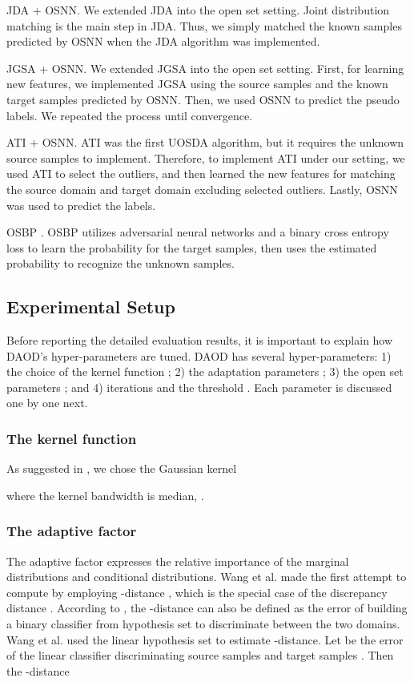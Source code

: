 \documentclass[journal]{IEEEtran}
\begin{document}
 JDA \cite{long2013transfer} + OSNN. We extended JDA into the open set setting. Joint distribution matching is the main step in JDA. Thus, we simply matched the known samples predicted by OSNN when the JDA algorithm was implemented.

 JGSA \cite{DBLP:conf/cvpr/ZhangLO17} + OSNN. We extended JGSA into the open set setting. First, for learning new features, we implemented JGSA using the source samples and the known target samples predicted by OSNN. Then, we used OSNN to predict the pseudo labels. We repeated the process until convergence. 

 ATI \cite{DBLP:conf/iccv/BustoG17} + OSNN. ATI was the first UOSDA algorithm, but it requires the unknown source samples to implement. Therefore, to implement ATI under our setting, we used ATI to select the outliers, and then learned the new features for matching the source domain and target domain excluding selected outliers. Lastly, OSNN was used to predict the labels.

 OSBP \cite{DBLP:conf/eccv/SaitoYUH18}. OSBP utilizes adversarial neural networks and a binary cross entropy loss to learn the probability for the target samples, then uses the estimated probability to recognize the unknown samples.


\subsection{{Experimental Setup}}
Before reporting the detailed evaluation results, it is important to
explain how DAOD's hyper-parameters are tuned. DAOD has several hyper-parameters: 1) the choice
of the kernel function ; 2) the adaptation parameters ; 3) the open set parameters ; and 4) iterations  and the threshold .  Each parameter is discussed one by one next. 

\subsubsection{{The kernel function } }

As suggested in \cite{gretton2012kernel,DBLP:conf/mm/WangFCYHY18}, we chose the Gaussian kernel

where the kernel bandwidth  is median, .

\subsubsection{{The adaptive factor }}

The adaptive factor  expresses the relative importance of the marginal distributions and conditional distributions. Wang et al. \cite{DBLP:conf/mm/WangFCYHY18} made the first attempt to compute  by employing -distance \cite{DBLP:conf/nips/Ben-DavidBCP06}, which is the special case  of the discrepancy distance . According to \cite{DBLP:conf/nips/Ben-DavidBCP06}, the -distance can also be defined as the error of building
a binary classifier from hypothesis set  to discriminate between the two domains. Wang et al. \cite{DBLP:conf/mm/WangFCYHY18} used the linear hypothesis set to estimate -distance. Let  be the error of the linear classifier  discriminating source samples  and target samples . Then the -distance
\end{document}
